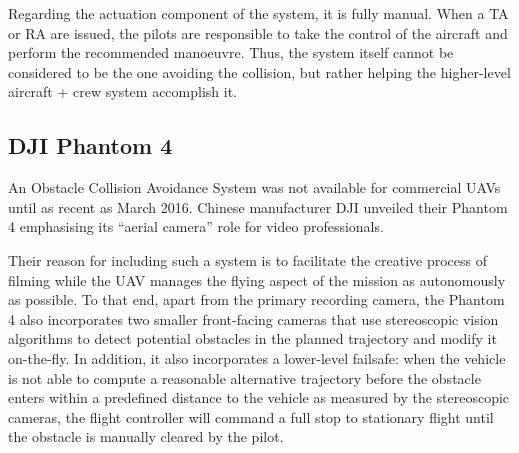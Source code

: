 Regarding the actuation component of the system, it is fully manual.
When a TA or RA are issued, the pilots are responsible to take the control of the aircraft and perform the recommended manoeuvre.
Thus, the system itself cannot be considered to be the one avoiding the collision, but rather helping the higher-level aircraft + crew system accomplish it.

\subsection{DJI Phantom 4}

An Obstacle Collision Avoidance System was not available for commercial UAVs until as recent as March 2016.
Chinese manufacturer DJI unveiled their Phantom 4 emphasising its ``aerial camera'' role for video professionals.

Their reason for including such a system is to facilitate the creative process of filming while the UAV manages the flying aspect of the mission as autonomously as possible.
To that end, apart from the primary recording camera, the Phantom 4 also incorporates two smaller front-facing cameras that use stereoscopic vision algorithms to detect potential obstacles in the planned trajectory and modify it on-the-fly.
In addition, it also incorporates a lower-level failsafe: when the vehicle is not able to compute a reasonable alternative trajectory before the obstacle enters within a predefined distance to the vehicle as measured by the stereoscopic cameras, the flight controller will command a full stop to stationary flight until the obstacle is manually cleared by the pilot.





% 
% 


